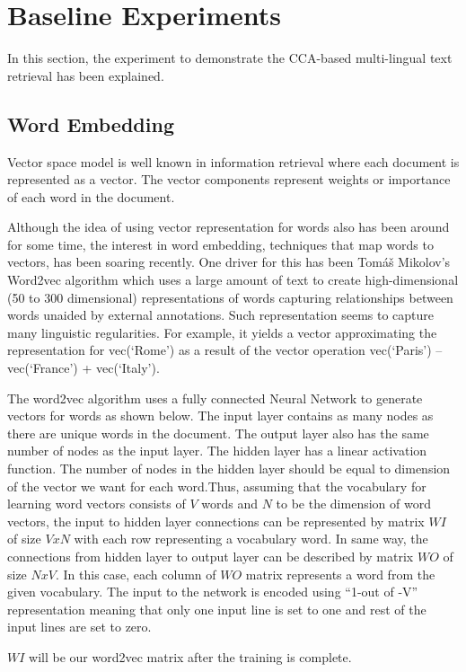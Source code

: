\documentclass{article} %
\begin{document}
\section{Baseline Experiments}
\label{experiment}

In this section, the experiment to demonstrate the CCA-based multi-lingual text retrieval has been explained.
\subsection{Word Embedding}
Vector space model is well known in information retrieval where each document is represented as a vector. The vector components represent weights or importance of each word in the document.

Although the idea of using vector representation for words also has been around for some time, the interest in word embedding, techniques that map words to vectors, has been soaring recently. One driver for this has been Tomáš Mikolov’s Word2vec algorithm which uses a large amount of text to create high-dimensional (50 to 300 dimensional) representations of words capturing relationships between words unaided by external annotations. Such representation seems to capture many linguistic regularities. For example, it yields a vector approximating the representation for vec(‘Rome’) as a result of the vector operation vec(‘Paris’) – vec(‘France’) + vec(‘Italy’).

The word2vec algorithm uses a fully connected Neural Network to generate vectors for words as shown below. The input layer contains as many nodes as there are unique words in the document. The output layer also has the same number of nodes as the input layer. The hidden layer has a linear activation function. The number of nodes in the hidden layer should be equal to dimension of the vector we want for each word.Thus, assuming that the vocabulary for learning word vectors consists of $V$ words and $N$ to be the dimension of word vectors, the input to hidden layer connections can be represented by matrix $WI$ of size $VxN$ with each row representing a vocabulary word. In same way, the connections from hidden layer to output layer can be described by matrix $WO$ of size $NxV$. In this case, each column of $WO$ matrix represents a word from the given vocabulary. The input to the network is encoded using “1-out of -V” representation meaning that only one input line is set to one and rest of the input lines are set to zero.

$WI$ will be our word2vec matrix after the training is complete.
\end{document}
